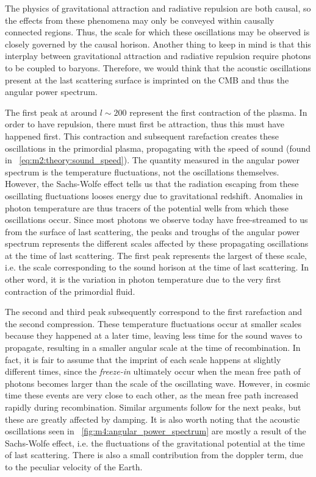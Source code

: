         The physics of gravitational attraction and radiative repulsion are both causal, so the effects from these phenomena may only be conveyed within causally connected regions. Thus, the scale for which these oscillations may be observed is closely governed by the causal horison. Another thing to keep in mind is that this interplay between gravitational attraction and radiative repulsion require photons to be coupled to baryons. Therefore, we would think that the acoustic oscillations present at the last scattering surface is imprinted on the CMB and thus the angular power spectrum.

        The first peak at around $l\sim200$ represent the first contraction of the plasma. In order to have repulsion, there must first be attraction, thus this must have happened first. This contraction and subsequent rarefaction creates these oscillations in the primordial plasma, propagating with the speed of sound (found in ~\cref{eq:m2:theory:sound_speed}). The quantity measured in the angular power spectrum is the temperature fluctuations, not the oscillations themselves. However, the Sachs-Wolfe effect tells us that the radiation escaping from these oscillating fluctuations looses energy due to gravitational redshift. Anomalies in photon temperature are thus tracers of the potential wells from which these oscillations occur. Since most photons we observe today have free-streamed to us from the surface of last scattering, the peaks and troughs of the angular power spectrum represents the different scales affected by these propagating oscillations at the time of last scattering. The first peak represents the largest of these scale, i.e. the scale corresponding to the sound horison at the time of last scattering. In other word, it is the variation in photon temperature due to the very first contraction of the primordial fluid. 

        The second and third peak subsequently correspond to the first rarefaction and the second compression. These temperature fluctuations occur at smaller scales because they happened at a later time, leaving less time for the sound waves to propagate, resulting in a smaller angular scale at the time of recombination. In fact, it is fair to assume that the imprint of each scale happens at slightly different times, since the \textit{freeze-in} ultimately occur when the mean free path of photons becomes larger than the scale of the oscillating wave. However, in cosmic time these events are very close to each other, as the mean free path increased rapidly during recombination. Similar arguments follow for the next peaks, but these are greatly affected by damping. It is also worth noting that the acoustic oscillations seen in ~\cref{fig:m4:angular_power_spectrum} are mostly a result of the Sachs-Wolfe effect, i.e. the fluctuations of the gravitational potential at the time of last scattering. There is also a small contribution from the doppler term, due to the peculiar velocity of the Earth. 

